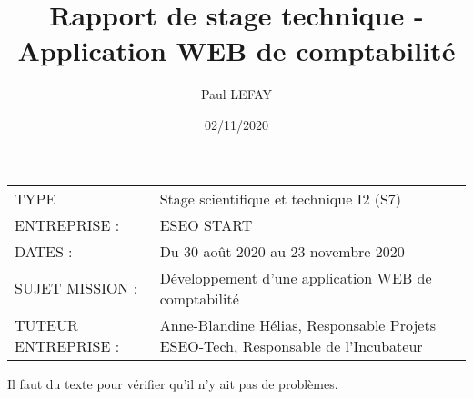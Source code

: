 \documentclass[twoside]{article}
\title{Rapport de stage technique - Application WEB de comptabilité}
\author{Paul LEFAY}
\date{02/11/2020}
\begin{document}
\cfoot{\thepage}

\maketitle{}										%

\begin{center}
	\begin{tabular}{ m{8cm} m{8cm} }
	TYPE & \mbox{\ooalign{$\checkmark$\cr\hidewidth$\square$\hidewidth\cr}}  Stage scientifique et technique I2 (S7) \\
   ENTREPRISE :  & ESEO START \\
   DATES : & Du 30 août 2020 au 23 novembre 2020 \\
   SUJET MISSION : & Développement d'une application WEB de comptabilité \\
   TUTEUR ENTREPRISE :  & Anne-Blandine Hélias, Responsable Projets ESEO-Tech, Responsable de l'Incubateur
 \end{tabular}
\end{center}

\newpage
Il faut du texte pour vérifier qu'il n'y ait pas de problèmes.
\end{document}
